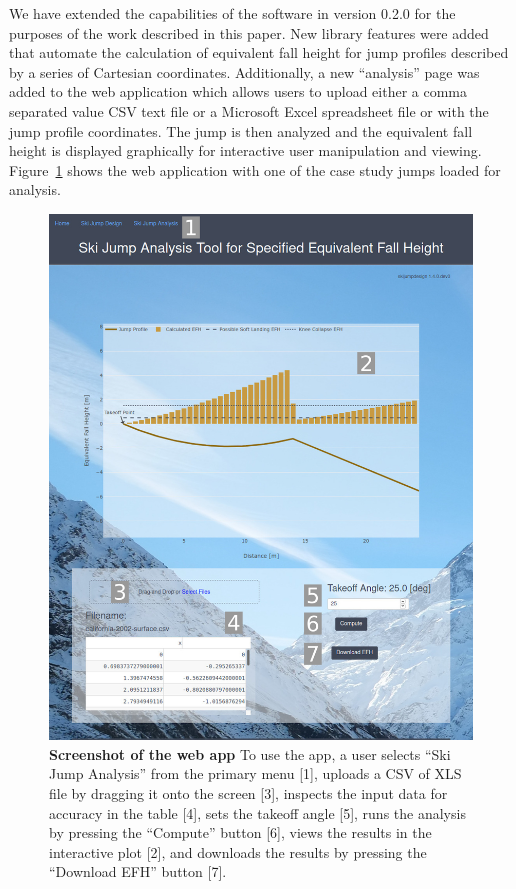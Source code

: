 \documentclass{article}
\begin{document}
We have extended the capabilities of the software in version 0.2.0 for the
purposes of the work described in this paper. New library features were added
that automate the calculation of equivalent fall height for jump profiles
described by a series of Cartesian coordinates.
Additionally, a new
``analysis'' page was added to the web application which allows users to upload
either a comma separated value CSV text file or a Microsoft Excel spreadsheet
file or with the jump profile coordinates. The jump is then analyzed and the
equivalent fall height is displayed graphically for interactive user
manipulation and viewing. Figure~\ref{fig:web-app-screenshot} shows the web
application with one of the case study jumps loaded for analysis.
%
\begin{figure}
  \centering
  \includegraphics[width=5.00in]{figures/web-app-screenshot.png}
  \caption{\textbf{Screenshot of the web app} To use the app, a user selects
    ``Ski Jump Analysis'' from the primary menu [1], uploads a CSV of XLS file
    by dragging it onto the screen [3], inspects the input data for accuracy in
    the table [4], sets the takeoff angle [5], runs the analysis by pressing
    the ``Compute'' button [6], views the results in the interactive plot [2],
    and downloads the results by pressing the ``Download EFH'' button [7].}
  \label{fig:web-app-screenshot}
\end{figure}
\end{document}
